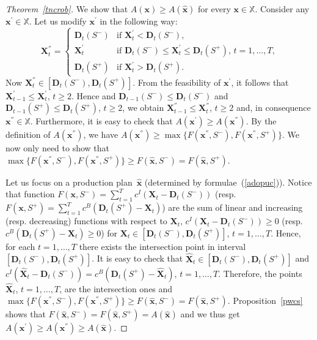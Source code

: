 \documentclass[11pt]{article}
\newcommand{\Xset}{\mathbb{X}}
\begin{document}
\begin{proof}[Theorem~\ref{tncrob}]
We show that $A(\pmb{x})\geq A(\hat{\pmb{x}})$ for every $\pmb{x}\in \Xset$.
Consider any $\pmb{x}^{'}\in \Xset$. Let us modify $\pmb{x}^{'}$ in the following way:
\[
\mathbf{X}^{''}_t=
\begin{cases}
	\mathbf{D}_t(S^{-}) &\text{if $\mathbf{X}^{'}_t<\mathbf{D}_t(S^{-})$,}\\
	\mathbf{X}^{'}_t &\text{if $\mathbf{D}_t(S^{-})\leq \mathbf{X}^{'}_t \leq \mathbf{D}_t(S^{+})$, $t=1,\ldots, T$,}\\
	\mathbf{D}_t(S^{+}) &\text{if $\mathbf{X}^{'}_t>\mathbf{D}_t(S^{+})$.}
\end{cases}
\]
Now $\mathbf{X}^{''}_t \in  [\mathbf{D}_t(S^{-}),\mathbf{D}_t(S^{+})]$.
From the feasibility of $\pmb{x}^{'}$, it follows that 
 $\mathbf{X}^{'}_{t-1} \leq  \mathbf{X}^{'}_t$, $t\geq 2$.
 Hence and  
$\mathbf{D}_{t-1}(S^{-})\leq \mathbf{D}_{t}(S^{-})$ and 
$\mathbf{D}_{t-1}(S^{+})\leq \mathbf{D}_{t}(S^{+})$, $t\geq 2$,
we obtain $\mathbf{X}^{''}_{t-1} \leq  \mathbf{X}^{''}_t$, $t\geq 2$ and, in
consequence $\pmb{x}^{''}\in \Xset$. Furthermore, it is easy to check that
$A(\pmb{x}^{'})\geq A(\pmb{x}^{''})$. By the definition of $A(\pmb{x}^{''})$, we have
$A(\pmb{x}^{''})\geq\max\{F(\pmb{x}^{''},S^{-}), F(\pmb{x}^{''},S^{+})\}$.
We now only need to show that $\max\{F(\pmb{x}^{''},S^{-}), F(\pmb{x}^{''},S^{+})\}\geq 
F(\hat{\pmb{x}},S^{-})=F(\hat{\pmb{x}},S^{+})$.

Let us focus on a production plan~$\hat{\pmb{x}}$ (determined by formulae~(\ref{adopuc})).
Notice that function $F(\pmb{x},S^{-})=\sum_{t=1}^{T}c^{I}(\mathbf{X}_t-\mathbf{D}_t(S^{-}))$
(resp. $F(\pmb{x},S^{+})=\sum_{t=1}^{T}c^{B}(\mathbf{D}_t(S^{+})-\mathbf{X}_t)$)
are the sum of  linear and increasing  (resp. decreasing) functions 
 with respect to $\mathbf{X}_t$,  $c^{I}(\mathbf{X}_t-\mathbf{D}_t(S^{-}))\geq 0$
 (resp. $c^{B}(\mathbf{D}_t(S^{+})-\mathbf{X}_t)\geq 0$) for
 $\mathbf{X}_t \in  [\mathbf{D}_t(S^{-}),\mathbf{D}_t(S^{+})]$, $t=1,\ldots,T$.
 Hence, for each $t=1,\ldots,T$ there exists the intersection point in interval
 $[\mathbf{D}_t(S^{-}),\mathbf{D}_t(S^{+})]$.
 It is easy to check that 
$\hat{\mathbf{X}}_t \in  [\mathbf{D}_t(S^{-}),\mathbf{D}_t(S^{+})]$ and
$c^{I}(\hat{\mathbf{X}}_t-\mathbf{D}_t(S^{-}))=
c^{B}(\mathbf{D}_t(S^{+})-\hat{\mathbf{X}}_t)$, $t=1,\ldots,T$.
Therefore, the points $\hat{\mathbf{X}}_t$,  $t=1,\ldots,T$,
 are the intersection ones and
$\max\{F(\pmb{x}^{''},S^{-}), F(\pmb{x}^{''},S^{+})\}\geq 
F(\hat{\pmb{x}},S^{-})=F(\hat{\pmb{x}},S^{+})$. Proposition~\ref{pwcs}
shows that $F(\hat{\pmb{x}},S^{-})=F(\hat{\pmb{x}},S^{+})=A(\hat{\pmb{x}})$ and we thus get
$A(\pmb{x}^{'})\geq A(\pmb{x}^{''})\geq A(\hat{\pmb{x}})$.
 \end{proof}
\end{document}
